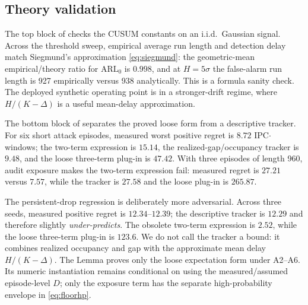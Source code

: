 \documentclass{article}
\begin{document}
\subsection{Theory validation}
The top block of  checks the CUSUM constants on an i.i.d.\ Gaussian signal.
Across the threshold sweep, empirical average run length and detection delay
match Siegmund's approximation \cref{eq:siegmund}: the geometric-mean
empirical/theory ratio for $\mathrm{ARL}_0$ is $0.998$, and at $H=5\sigma$ the false-alarm run length
is 927 empirically versus 938 analytically. This is a formula sanity check. The
deployed synthetic operating point is in a stronger-drift regime, where
$H/(K-\Delta)$ is a useful mean-delay approximation.

The bottom block of  separates the proved loose form from a descriptive tracker.
For six short attack episodes, measured worst positive regret is $8.72$
IPC$\cdot$windows; the two-term expression is $15.14$, the realized-gap/occupancy
tracker is $9.48$, and the loose three-term plug-in is $47.42$. With three
episodes of length 960, audit exposure makes the two-term expression fail:
measured regret is $27.21$ versus $7.57$, while the tracker is $27.58$ and the
loose plug-in is $265.87$.

The persistent-drop regression is deliberately more adversarial. Across three
seeds, measured positive regret is $12.34$--$12.39$; the descriptive tracker is
$12.29$ and therefore slightly \emph{under-predicts}. The obsolete two-term
expression is $2.52$, while the loose three-term plug-in is $123.6$. We do not
call the tracker a bound: it combines realized occupancy and
gap with the approximate mean delay $H/(K-\Delta)$. The Lemma proves only the
loose expectation form under A2--A6. Its numeric instantiation remains
conditional on using the measured/assumed episode-level $D$; only the exposure
term has the separate high-probability envelope in \cref{eq:floorhp}.
\end{document}
